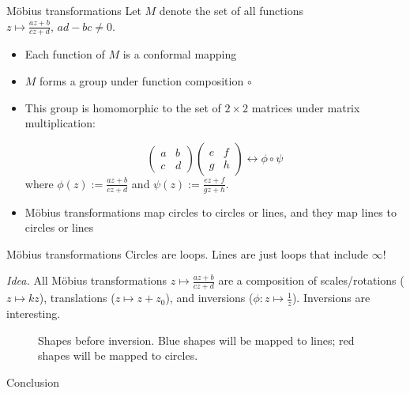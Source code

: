 \documentclass{beamer}
\begin{document}
\begin{frame}[t]{M\"{o}bius transformations} \vspace{4pt}
Let \(M\) denote the set of all functions \(z \mapsto \frac{az + b}{cz + d}, \, ad - bc \ne 0\).
\begin{itemize}
	\item Each function of \(M\) is a conformal mapping
	\item \(M\) forms a group under function composition \(\circ\)
	\item This group is homomorphic to the set of \(2 \times 2\) matrices under matrix multiplication:

	\[
		\begin{pmatrix}a & b \\ c & d\end{pmatrix} \begin{pmatrix}e & f \\ g & h\end{pmatrix} \leftrightarrow \phi \circ \psi
	\]
	where \(\phi(z) := \frac{az + b}{cz + d}\) and \(\psi(z) := \frac{ez + f}{gz + h}\).
	\item M\"{o}bius transformations map circles to circles or lines, and they map lines to circles or lines
\end{itemize}
\end{frame}

\begin{frame}[t]{M\"{o}bius transformations}
Circles are loops. Lines are just loops that include \(\infty\)!

\textit{Idea.} All M\"{o}bius transformations \(z \mapsto \frac{az + b}{cz + d}\) are a composition of scales/rotations (\(z \mapsto kz\)), translations (\(z \mapsto z + z_0\)), and inversions (\(\phi: z \mapsto \frac{1}{z}\)). Inversions are interesting.

\begin{figure}
  	
  	\caption{Shapes before inversion. Blue shapes will be mapped to lines; red shapes will be mapped to circles.}
  	\label{fig:mobius}
\end{figure}
\end{frame}

\begin{frame}[standout]
\flushleft
Conclusion
\end{frame}
\end{document}
